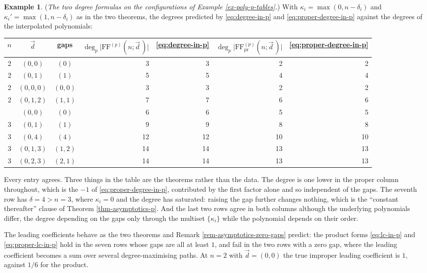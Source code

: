 \documentclass[11pt, a4paper, abstract=yes]{scrartcl}
\theoremstyle{definition}
\newtheorem{mexample}[definition]{Example}
\theoremstyle{remark}
\theoremstyle{plain}
\begin{document}
\begin{mexample}
(\emph{The two degree formulas on the configurations of Example \ref{ex-poly-p-tables}.}) With
\(\kappa_i=\max(0,n-\delta_i)\) and \(\kappa_i'=\max(1,n-\delta_i)\) as in the two theorems, the
degrees predicted by \eqref{eq:degree-in-p} and \eqref{eq:proper-degree-in-p} against the degrees of
the interpolated polynomials:
\begingroup\small
\begin{center}
\begin{tabular}{@{}cccrrrr@{}}
  \toprule
  \(n\) & \(\vec d\) & gaps & \(\deg_p\lvert\mathrm{FF}^{(p)}(n;\vec d\,)\rvert\) & \eqref{eq:degree-in-p}
        & \(\deg_p\lvert\mathrm{FF}^{(p)}_{\mathrm{pr}}(n;\vec d\,)\rvert\) & \eqref{eq:proper-degree-in-p}\\
  \midrule
  2 & \((0,0)\)   & \((0)\)   & 3  & 3  & 2  & 2\\
  2 & \((0,1)\)   & \((1)\)   & 5  & 5  & 4  & 4\\
  2 & \((0,0,0)\) & \((0,0)\) & 3  & 3  & 2  & 2\\
  2 & \((0,1,2)\) & \((1,1)\) & 7  & 7  & 6  & 6\\
  \addlinespace
  3 & \((0,0)\)   & \((0)\)   & 6  & 6  & 5  & 5\\
  3 & \((0,1)\)   & \((1)\)   & 9  & 9  & 8  & 8\\
  3 & \((0,4)\)   & \((4)\)   & 12 & 12 & 10 & 10\\
  3 & \((0,1,3)\) & \((1,2)\) & 14 & 14 & 13 & 13\\
  3 & \((0,2,3)\) & \((2,1)\) & 14 & 14 & 13 & 13\\
  \bottomrule
\end{tabular}
\end{center}
\endgroup
Every entry agrees. Three things in the table are the theorems rather than the data. The degree is
one lower in the proper column throughout, which is the \(-1\) of \eqref{eq:proper-degree-in-p},
contributed by the first factor alone and so independent of the gaps. The seventh row has
\(\delta=4>n=3\), where \(\kappa_i=0\) and the degree has saturated: raising the gap further changes
nothing, which is the ``constant thereafter'' clause of Theorem \ref{thm-asymptotics-p}. And the last two
rows agree in both columns although the underlying polynomials differ, the degree depending on the
gaps only through the multiset \(\lbrace\kappa_i\rbrace\) while the polynomial depends on their order.

The leading coefficients behave as the two theorems and Remark \ref{rem-asymptotics-zero-gaps} predict:
the product forms \eqref{eq:lc-in-p} and \eqref{eq:proper-lc-in-p} hold in the seven rows whose gaps
are all at least \(1\), and fail in the two rows with a zero gap, where the leading coefficient
becomes a sum over several degree-maximising paths. At \(n=2\) with \(\vec d=(0,0)\) the true improper
leading coefficient is \(1\), against \(1/6\) for the product.
\label{ex-degrees-p}
\end{mexample}
\end{document}

